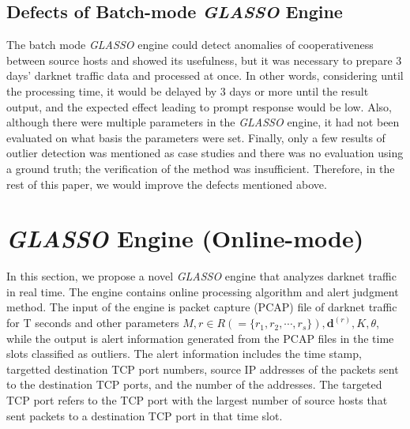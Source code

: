 \documentclass[conference]{IEEEtran}
\begin{document}
\subsection{Defects of Batch-mode {\it GLASSO} Engine}
The batch mode {\it GLASSO} engine could detect anomalies of cooperativeness between source hosts and showed its usefulness, but it was necessary to prepare 3 days' darknet traffic data and processed at once.
In other words, considering until the processing time, it would be delayed by 3 days or more until the result output, and the expected effect leading to prompt response would be low.
Also, although there were multiple parameters in the {\it GLASSO} engine, it had not been evaluated on what basis the parameters were set.
Finally, only a few results of outlier detection was mentioned as case studies and there was no evaluation using a ground truth; the verification of the method was insufficient.
Therefore, in the rest of this paper, we would improve the defects mentioned above.



\section{{\it GLASSO} Engine (Online-mode)}
In this section, we propose a novel {\it GLASSO} engine that analyzes darknet traffic in real time.
The engine contains online processing algorithm and alert judgment method.
The input of the engine is packet capture (PCAP) file of darknet traffic for T seconds and other parameters $M, r \in R ( = \{r_1, r_2, \cdots, r_s\} ), \bm{d}^{(r)}, K, \theta$, while the output is alert information generated from the PCAP files in the time slots classified as outliers.
The alert information includes the time stamp, targetted destination TCP port numbers, source IP addresses of the packets sent to the destination TCP ports, and the number of the addresses.
The targeted TCP port refers to the TCP port with the largest number of source hosts that sent packets to a destination TCP port in that time slot.


\end{document}
